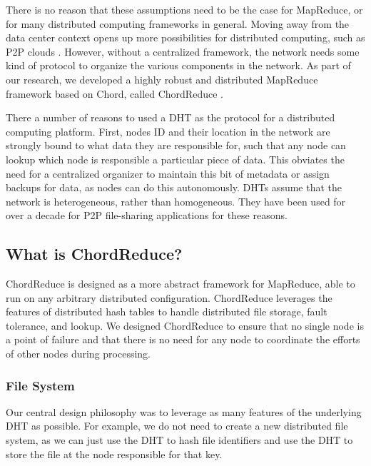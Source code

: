 There is no reason that these assumptions need to be the case for MapReduce, or for many distributed computing frameworks in general.
Moving away from the data center context opens up more possibilities for distributed computing, such as P2P clouds \cite{p2p-cloud}.
However, without a centralized framework, the network needs some kind of protocol to organize the various components in the network.
As part of our research, we developed a highly robust and distributed MapReduce framework based on Chord, called ChordReduce \cite{chordreduce}.

There a number of reasons to used a DHT as the protocol for a distributed computing platform.
First, nodes ID and their location in the network are strongly bound to what data they are responsible for, such that any node can lookup which node is responsible a particular piece of data.
This obviates the need for a centralized organizer to maintain this bit of metadata or assign backups for data, as nodes can do this autonomously.
DHTs assume that the network is heterogeneous, rather than homogeneous.
They have been used for over a decade for P2P file-sharing applications for these reasons.




\subsection{What is ChordReduce?}

ChordReduce \cite{chordreduce} is designed as a more abstract framework for MapReduce, able to run on any arbitrary distributed configuration.
ChordReduce leverages the features of distributed hash tables to handle distributed file storage, fault tolerance, and lookup.
We designed ChordReduce to ensure that no single node is a point of failure and that there is no need for any node to coordinate the efforts of other nodes during processing.



\subsubsection{File System}
Our central design philosophy was to leverage as many features of the underlying DHT as possible.
For example, we do not need to create a new distributed file system, as we can just use the DHT to hash file identifiers and use the DHT to store the file at the node responsible for that key.

